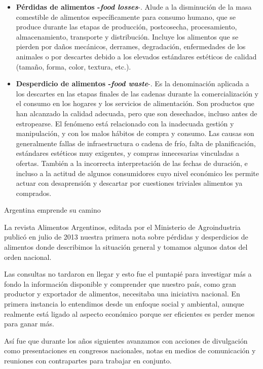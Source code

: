 \begin{itemize}
\item
  \textbf{Pérdidas de alimentos -\emph{food losses}}-. Alude a la
  disminución de la masa comestible de alimentos específicamente para
  consumo humano, que se produce durante las etapas de producción,
  postcosecha, procesamiento, almacenamiento, transporte y distribución.
  Incluye los alimentos que se pierden por daños mecánicos, derrames,
  degradación, enfermedades de los animales o por descartes debido a los
  elevados estándares estéticos de calidad (tamaño, forma, color,
  textura, etc.).
\item
  \textbf{Desperdicio de alimentos -\emph{food waste}}-. Es la
  denominación aplicada a los descartes en las etapas finales de las
  cadenas durante la comercialización y el consumo en los hogares y los
  servicios de alimentación. Son productos que han alcanzado la calidad
  adecuada, pero que son desechados, incluso antes de estropearse. El
  fenómeno está relacionado con la inadecuada gestión y manipulación, y
  con los malos hábitos de compra y consumo. Las causas son generalmente
  fallas de infraestructura o cadena de frío, falta de planificación,
  estándares estéticos muy exigentes, y compras innecesarias vinculadas
  a ofertas. También a la incorrecta interpretación de las fechas de
  duración, e incluso a la actitud de algunos consumidores cuyo nivel
  económico les permite actuar con desaprensión y descartar por
  cuestiones triviales alimentos ya comprados.
\end{itemize}

Argentina emprende su camino

La revista Alimentos Argentinos, editada por el Ministerio de
Agroindustria publicó en julio de 2013 nuestra primera nota sobre
pérdidas y desperdicios de alimentos donde describimos la situación
general y tomamos algunos datos del orden nacional.

Las consultas no tardaron en llegar y esto fue el puntapié para
investigar más a fondo la información disponible y comprender que
nuestro país, como gran productor y exportador de alimentos, necesitaba
una iniciativa nacional. En primera instancia lo entendimos desde un
enfoque social y ambiental, aunque realmente está ligado al aspecto
económico porque ser eficientes es perder menos para ganar más.

Así fue que durante los años siguientes avanzamos con acciones de
divulgación como presentaciones en congresos nacionales, notas en medios
de comunicación y reuniones con contrapartes para trabajar en conjunto.

